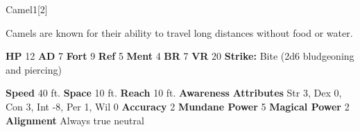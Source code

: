   \begin{monsection}{Camel}{1}[2]
    \vspace{-1em}\vspace{-1em}
    \vspace{0em}

    
        Camels are known for their ability to travel long distances without food or water.
      

    \begin{spellcontent}
      \begin{spelltargetinginfo}
        \pari \textbf{HP} 12 \monsep
          \textbf{AD} 7 \monsep
          \textbf{Fort} 9 \monsep
          \textbf{Ref} 5 \monsep
          \textbf{Ment} 4
        \pari \textbf{BR} 7 \monsep
        \textbf{VR} 20
        \pari \textbf{Strike:}
            Bite  (2d6 bludgeoning and piercing)
      \end{spelltargetinginfo}
    \end{spellcontent}
    \begin{monsterfooter}
      \pari \textbf{Speed} 40 ft. \monsep
        \textbf{Space} 10 ft. \monsep
        \textbf{Reach} 10 ft.
      \pari \textbf{Awareness} 
      \pari \textbf{Attributes}
        Str 3, Dex 0,
        Con 3, Int -8,
        Per 1, Wil 0
      \pari \textbf{Accuracy} 2 \monsep
        \textbf{Mundane Power} 5 \monsep
      \textbf{Magical Power} 2
      \pari \textbf{Alignment} Always true neutral
    \end{monsterfooter}
  \end{monsection}
  
